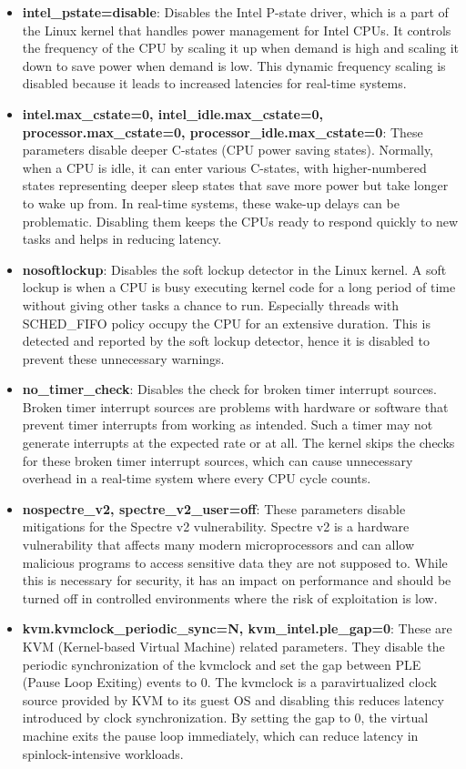 \documentclass[MMR,Master,english]{style/twbook}
\begin{document}
\begin{itemize}
	\item \textbf{intel\_pstate=disable}: Disables the Intel P-state driver, which is a part of the Linux kernel that handles power management for Intel CPUs. It controls the frequency of the CPU by scaling it up when demand is high and scaling it down to save power when demand is low. This dynamic frequency scaling is disabled because it leads to increased latencies for real-time systems.
	\item \textbf{intel.max\_cstate=0, intel\_idle.max\_cstate=0, processor.max\_cstate=0, processor\_idle.max\_cstate=0}: These parameters disable deeper C-states (CPU power saving states). Normally, when a CPU is idle, it can enter various C-states, with higher-numbered states representing deeper sleep states that save more power but take longer to wake up from. In real-time systems, these wake-up delays can be problematic. Disabling them keeps the CPUs ready to respond quickly to new tasks and helps in reducing latency.
	\item \textbf{nosoftlockup}: Disables the soft lockup detector in the Linux kernel. A soft lockup is when a CPU is busy executing kernel code for a long period of time without giving other tasks a chance to run. Especially threads with SCHED\_FIFO policy occupy the CPU for an extensive duration. This is detected and reported by the soft lockup detector, hence it is disabled to prevent these unnecessary warnings.
	\item \textbf{no\_timer\_check}: Disables the check for broken timer interrupt sources. Broken timer interrupt sources are problems with hardware or software that prevent timer interrupts from working as intended. Such a timer may not generate interrupts at the expected rate or at all. The kernel skips the checks for these broken timer interrupt sources, which can cause unnecessary overhead in a real-time system where every CPU cycle counts.
	\item \textbf{nospectre\_v2, spectre\_v2\_user=off}: These parameters disable mitigations for the Spectre v2 vulnerability. Spectre v2 is a hardware vulnerability that affects many modern microprocessors and can allow malicious programs to access sensitive data they are not supposed to. While this is necessary for security, it has an impact on performance and should be turned off in controlled environments where the risk of exploitation is low.
	\item \textbf{kvm.kvmclock\_periodic\_sync=N, kvm\_intel.ple\_gap=0}: These are KVM (Kernel-based Virtual Machine) related parameters. They disable the periodic synchronization of the kvmclock and set the gap between PLE (Pause Loop Exiting) events to 0. The kvmclock is a paravirtualized clock source provided by KVM to its guest OS and disabling this reduces latency introduced by clock synchronization. By setting the gap to 0, the virtual machine exits the pause loop immediately, which can reduce latency in spinlock-intensive workloads.

\end{itemize}
\end{document}
